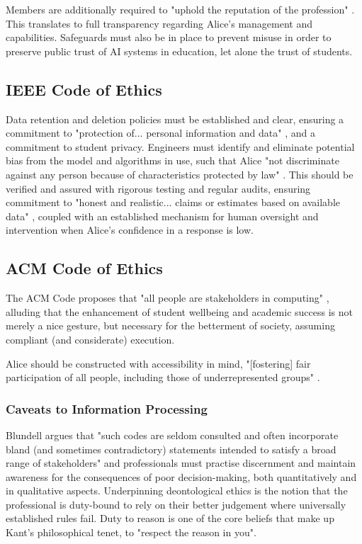 \documentclass[14pt,a4paper]{article}
\begin{document}
\begin{multicols}{2}
Members are additionally required to "uphold the reputation of the profession" \textit{\parencite[p. 3]{BCS2024}}.
This translates to full transparency regarding Alice's management and capabilities.
Safeguards must also be in place to prevent misuse in order to preserve public trust of AI systems in education, let alone the trust of students.

\subsection{IEEE Code of Ethics}
Data retention and deletion policies must be established and clear, ensuring a commitment to "protection of... personal information and data" \textit{\parencite[p. 1]{IEEE2024}}, and a commitment to student privacy.
Engineers must identify and eliminate potential bias from the model and algorithms in use, such that Alice "not discriminate against any person because of characteristics protected by law" \textit{\parencite[p. 1]{IEEE2024}}.
This should be verified and assured with rigorous testing and regular audits, ensuring commitment to "honest and realistic... claims or estimates based on available data" \textit{\parencite[p. 2]{IEEE2024}}, coupled with an established mechanism for human oversight and intervention when Alice's confidence in a response is low.

\subsection{ACM Code of Ethics}
The ACM Code proposes that "all people are stakeholders in computing" \textit{\parencite[p. 1]{ACM2024}}, alluding that the enhancement of student wellbeing and academic success is not merely a nice gesture, but necessary for the betterment of society, assuming compliant (and considerate) execution.

Alice should be constructed with accessibility in mind, "[fostering] fair participation of all people, including those of underrepresented groups" \textit{\parencite[p. 2]{ACM2024}}.

\subsubsection*{Caveats to Information Processing}
Blundell argues that "such codes are seldom consulted and often incorporate bland (and sometimes contradictory) statements intended to satisfy a broad range of stakeholders" \textit{\parencite[p. 40]{Blundell2020}} and professionals must practise discernment and maintain awareness for the consequences of poor decision-making, both quantitatively and in qualitative aspects.
Underpinning deontological ethics is the notion that the professional is duty-bound to rely on their better judgement where universally established rules fail.
Duty to reason is one of the core beliefs that make up Kant's philosophical tenet, to "respect the reason in you".


\end{multicols}
\end{document}
